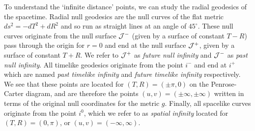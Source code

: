 To understand the `infinite distance' points, we can study the radial geodesics of the spacetime. Radial null geodesics are the null curves of the flat metric $ds^2 = -dT^2 + dR^2$ and so run as straight lines at an angle of $45^\circ$. These null curves originate from the null surface ${\cal J}^-$ (given by a surface of constant $T - R$) pass through the origin for $r = 0$ and end at the null surface ${\cal J}^+$, given by a surface of constant $T + R$. We refer to  ${\cal J}^+$ as \emph{future null infinity} and ${\cal J}^-$ as \emph{past null infinity}. All timelike geodesics originate from the point $i^-$ and end at $i^+$ which are named \emph{past timelike infinity} and \emph{future timelike infinity} respectively. We see that these points are located for $(T,R) = (\pm \pi, 0)$ on the Penrose-Carter diagram, and are therefore the points $(u,v) = (\pm \infty, \pm \infty)$ written in terms of the original null coordinates for the metric $g$. Finally, all spacelike curves originate from the point $i^0$, which we refer to as \emph{spatial infinity} located for $(T,R) = (0,\pi)$, or $(u,v) = (-\infty, \infty)$. 

